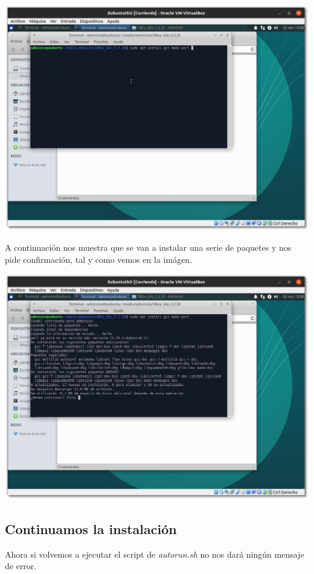 \documentclass[11pt]{article}
\begin{document}
\begin{center}
\includegraphics[width=.9\linewidth]{imgs/VBox_GuestAdd_LinuX_020.png}
\end{center}

A continuación nos muestra que se van a instalar una serie de paquetes y
nos pide confirmación, tal y como vemos en la imágen.

\begin{center}
\includegraphics[width=.9\linewidth]{imgs/VBox_GuestAdd_LinuX_021.png}
\end{center}

\subsection{Continuamos la instalación}
\label{sec:org43a92b0}
Ahora si volvemos a ejecutar el script de \emph{autorun.sh} no nos dará
ningún mensaje de error.
\end{document}
